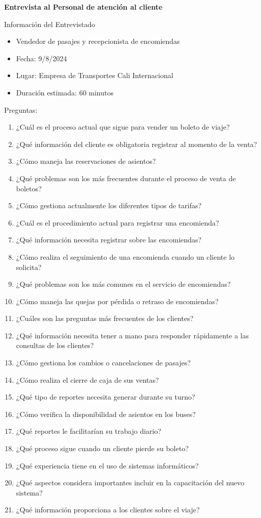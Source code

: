 	\textbf{Entrevista al Personal de atención al cliente}
		
	Información del Entrevistado
	\begin{itemize}[label=$-$, left=0cm, labelsep = 0.9cm, topsep = 0pt, parsep = 0pt]
		\item Vendedor de pasajes y recepcionista de encomiendas
		\item Fecha: 9/8/2024
		\item Lugar: Empresa de Transportes Cali Internacional
		\item Duración estimada: 60 minutos
	\end{itemize}
	
	Preguntas:
	
	\begin{enumerate}[left=0.1cm, labelsep = 0.9cm, topsep = 0pt, parsep = 0pt]
		\item ¿Cuál es el proceso actual que sigue para vender un boleto de viaje?
		\item ¿Qué información del cliente es obligatoria registrar al momento de la venta?
		\item ¿Cómo maneja las reservaciones de asientos?
		\item ¿Qué problemas son los más frecuentes durante el proceso de venta de boletos?
		\item ¿Cómo gestiona actualmente los diferentes tipos de tarifas?
		\item ¿Cuál es el procedimiento actual para registrar una encomienda?
		\item ¿Qué información necesita registrar sobre las encomiendas?
		\item ¿Cómo realiza el seguimiento de una encomienda cuando un cliente lo solicita?
		\item ¿Qué problemas son los más comunes en el servicio de encomiendas?
		\item ¿Cómo maneja las quejas por pérdida o retraso de encomiendas?
		\item ¿Cuáles son las preguntas más frecuentes de los clientes?
		\item ¿Qué información necesita tener a mano para responder rápidamente a las consultas de los clientes?
		\item ¿Cómo gestiona los cambios o cancelaciones de pasajes?
		\item ¿Cómo realiza el cierre de caja de sus ventas?
		\item ¿Qué tipo de reportes necesita generar durante su turno?
		\item ¿Cómo verifica la disponibilidad de asientos en los buses?
		\item ¿Qué reportes le facilitarían su trabajo diario?
		\item ¿Qué proceso sigue cuando un cliente pierde su boleto?
		\item ¿Qué experiencia tiene en el uso de sistemas informáticos?
		\item ¿Qué aspectos considera importantes incluir en la capacitación del nuevo sistema?
		\item ¿Qué información proporciona a los clientes sobre el viaje?
	\end{enumerate}
	
